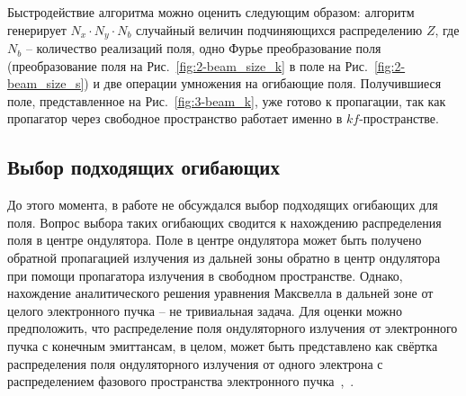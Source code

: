 Быстродействие алгоритма можно оценить следующим образом: алгоритм генерирует $N_x \cdot N_y \cdot N_b$ случайный величин подчиняющихся распределению $Z$, где $N_b$ -- количество реализаций поля, одно Фурье преобразование поля (преобразование поля на Рис.~\ref{fig:2-beam_size_k} в поле на Рис.~\ref{fig:2-beam_size_s}) и две операции умножения на огибающие поля. Получившиеся поле, представленное на Рис.~\ref{fig:3-beam_k}, уже готово к пропагации, так как пропагатор через свободное пространство работает именно в $kf$-пространстве.
\subsection{Выбор подходящих огибающих}
До этого момента, в работе не обсуждался выбор подходящих огибающих для поля. Вопрос выбора таких огибающих сводится к нахождению распределения поля в центре ондулятора. Поле в центре ондулятора может быть получено обратной пропагацией излучения из дальней зоны обратно в центр ондулятора при помощи пропагатора излучения в свободном пространстве. Однако, нахождение аналитического решения уравнения Максвелла в дальней зоне от целого электронного пучка -- не тривиальная задача.  Для оценки можно предположить, что распределение поля ондуляторного излучения от электронного пучка с конечным эмиттансам, в целом, может быть представлено как свёртка распределения поля ондуляторного излучения от одного электрона с распределением фазового пространства электронного пучка~\cite{geloni_transverse_2008},~\cite{chubar_simulation_2006}.

